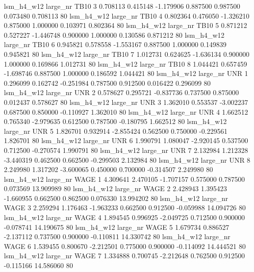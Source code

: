   lsm_h4_w12   large_nr     TB10                 3  0.708113  0.415148  -1.179906 0.887500 0.987500  0.073480    0.708113 80
  lsm_h4_w12   large_nr     TB10                 4  0.802364  0.476050  -1.326210 0.875000 1.000000  0.103971    0.802364 80
  lsm_h4_w12   large_nr     TB10                 5  0.871212  0.527227  -1.446748 0.900000 1.000000  0.130586    0.871212 80
  lsm_h4_w12   large_nr     TB10                 6  0.945821  0.578558  -1.553167 0.887500 1.000000  0.149839    0.945821 80
  lsm_h4_w12   large_nr     TB10                 7  1.012731  0.624625  -1.636134 0.900000 1.000000  0.169866    1.012731 80
  lsm_h4_w12   large_nr     TB10                 8  1.044421  0.657459  -1.698746 0.887500 1.000000  0.186592    1.044421 80
  lsm_h4_w12   large_nr      UNR                 1  0.296099  0.162742  -0.251984 0.787500 0.912500  0.016422    0.296099 80
  lsm_h4_w12   large_nr      UNR                 2  0.578627  0.295721  -0.837736 0.737500 0.875000  0.012437    0.578627 80
  lsm_h4_w12   large_nr      UNR                 3  1.362010  0.553537  -3.002237 0.687500 0.850000 -0.110927    1.362010 80
  lsm_h4_w12   large_nr      UNR                 4  1.662512  0.765340  -2.979635 0.612500 0.787500 -0.180795    1.662512 80
  lsm_h4_w12   large_nr      UNR                 5  1.826701  0.932914  -2.855424 0.562500 0.750000 -0.229561    1.826701 80
  lsm_h4_w12   large_nr      UNR                 6  1.990791  1.080047  -2.920145 0.537500 0.712500 -0.270574    1.990791 80
  lsm_h4_w12   large_nr      UNR                 7  2.132984  1.212328  -3.440319 0.462500 0.662500 -0.299503    2.132984 80
  lsm_h4_w12   large_nr      UNR                 8  2.249980  1.317202  -3.600065 0.450000 0.700000 -0.314507    2.249980 80
  lsm_h4_w12   large_nr     WAGE                 1  4.309641  2.470105  -1.707157 0.575000 0.787500  0.073569   13.909989 80
  lsm_h4_w12   large_nr     WAGE                 2  2.428943  1.395423  -1.660955 0.662500 0.862500  0.076330   13.994202 80
  lsm_h4_w12   large_nr     WAGE                 3  2.259294  1.176463  -1.963233 0.662500 0.912500 -0.059988   14.094726 80
  lsm_h4_w12   large_nr     WAGE                 4  1.894545  0.996925  -2.049725 0.712500 0.900000 -0.078741   14.190675 80
  lsm_h4_w12   large_nr     WAGE                 5  1.679734  0.886527  -2.137112 0.737500 0.900000 -0.110811   14.330742 80
  lsm_h4_w12   large_nr     WAGE                 6  1.539455  0.800670  -2.212501 0.775000 0.900000 -0.114092   14.444521 80
  lsm_h4_w12   large_nr     WAGE                 7  1.334888  0.700745  -2.212648 0.762500 0.912500 -0.115166   14.586060 80

